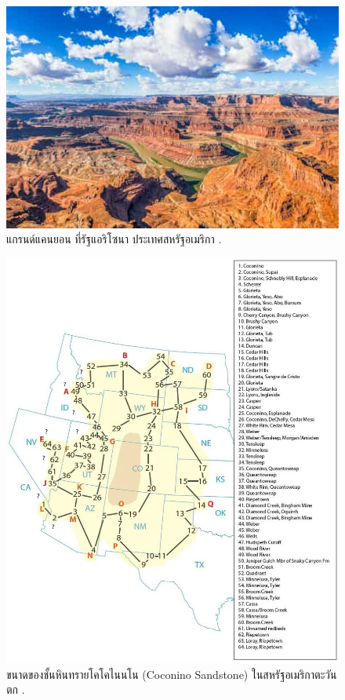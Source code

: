 \documentclass[10pt,twocolumn,letterpaper]{article}
\begin{document}
\begin{figure}[b]
\begin{center}
   \includegraphics[width=1\linewidth]{grand-canyon.jpg}

\end{center}
   \caption{แกรนด์แคนยอน ที่รัฐแอริโซนา ประเทศสหรัฐอเมริกา \cite{49}.}
\label{fig:2}
\label{fig:onecol}
\end{figure}

\begin{figure}[t]
\begin{center}
   \includegraphics[width=1\linewidth]{coconino.jpg}
\end{center}
   \caption{ขนาดของชั้นหินทรายโคโคไนนโน (Coconino Sandstone) ในสหรัฐอเมริกาตะวันตก \cite{21}.}
\label{fig:3}
\label{fig:onecol}
\end{figure}
\end{document}
